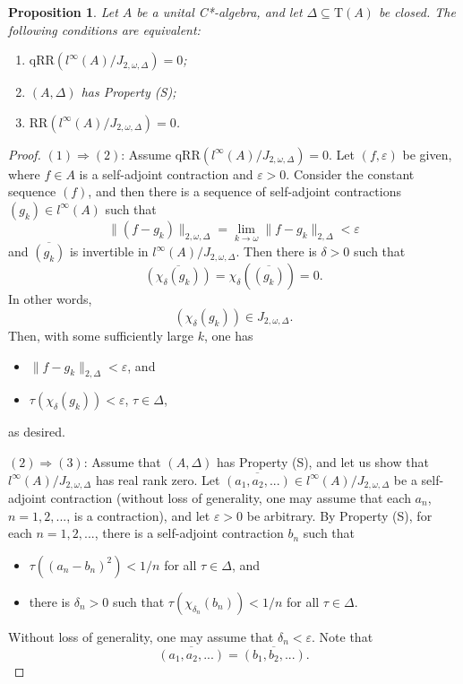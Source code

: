\documentclass[12pt, oneside, psamsfonts]{amsart}
\newtheorem{prop}[thm]{Proposition}
\theoremstyle{definition}
\theoremstyle{remark}
\numberwithin{equation}{section}
\newcommand{\norm}[1]{\| #1\|}
\newcommand{\eps}{\varepsilon}
\newcommand{\tr}{\mathrm{T}}
\begin{document}
\begin{prop}\label{character-S}
Let $A$ be a unital C*-algebra, and let $\Delta\subseteq\tr(A)$ be closed. The following conditions are equivalent:
\begin{enumerate}
\item[(1)] $\mathrm{qRR}(l^\infty(A)/J_{2, \omega, \Delta}) = 0$;
\item[(2)] $(A, \Delta)$ has Property (S);
\item[(3)] $\mathrm{RR}(l^\infty(A)/J_{2, \omega, \Delta}) = 0$.
\end{enumerate}
\end{prop}

\begin{proof}
$(1) \Rightarrow (2)$: Assume $\mathrm{qRR}(l^\infty(A)/J_{2, \omega, \Delta}) = 0$.  Let $(f, \eps)$ be given, where $f \in A$ is a self-adjoint contraction and $\eps>0$. Consider the constant sequence $(f)$, and then there is a sequence of self-adjoint contractions $(g_k) \in l^\infty(A)$ such that 
$$\norm{(f - g_k)}_{2, \omega, \Delta} = \lim_{k \to \omega}\norm{f - g_k}_{2, \Delta} < \eps$$
and $\overline{(g_k)}$ is invertible in $l^\infty(A)/J_{2, \omega, \Delta}$. Then there is $\delta>0$ such that
$$\overline{(\chi_\delta(g_k))} = \chi_\delta(\overline{(g_k)}) = 0.$$ 
In other words,
$$ (\chi_\delta(g_k)) \in J_{2, \omega, \Delta}.$$
Then, with some sufficiently large $k$, one has
\begin{itemize}
\item $\norm{f - g_k}_{2, \Delta} < \eps$, and
\item $\tau(\chi_\delta(g_k)) < \eps$, $\tau\in \Delta$,
\end{itemize}
as desired.

$(2) \Rightarrow (3)$: Assume that $(A, \Delta)$ has Property (S), and let us show that $l^\infty(A)/ J_{2, \omega, \Delta}$ has real rank zero. Let $\overline{(a_1, a_2, ...)} \in l^\infty(A)/ J_{2, \omega, \Delta}$ be a self-adjoint contraction (without loss of generality, one may assume that each $a_n$, $n=1, 2, ...$, is a contraction), and let $\eps>0$ be arbitrary. By Property (S), for each $n=1, 2, ...$, there is a self-adjoint contraction $b_n$ such that
\begin{itemize}
\item $\tau((a_n - b_n)^2) < 1/n$ for all $\tau\in\Delta$, and
\item there is $\delta_n>0$ such that $\tau(\chi_{\delta_n}(b_n)) < 1/n$ for all $\tau\in\Delta$.
\end{itemize}
Without loss of generality, one may assume that $\delta_n<\eps$.
Note that $$\overline{(a_1, a_2, ...)} = \overline{(b_1, b_2, ...)}.$$


\end{proof}
\end{document}
